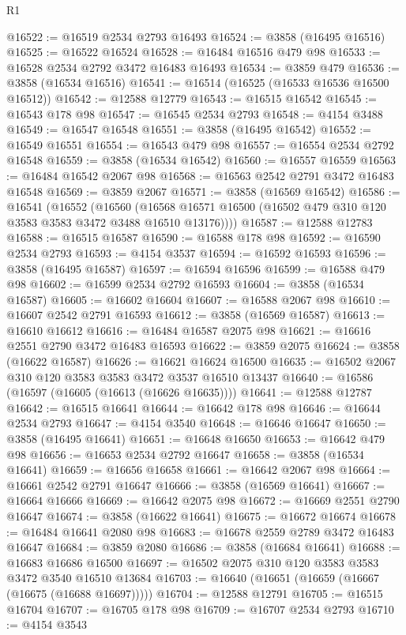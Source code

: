 \begin{lexlean}{R1}
\begin{coremodule}
@16522 := @16519 @2534 @2793 @16493
@16524 := @3858 (@16495 @16516)
@16525 := @16522 @16524
@16528 := @16484 @16516 @479 @98
@16533 := @16528 @2534 @2792 @3472 @16483 @16493
@16534 := @3859 @479
@16536 := @3858 (@16534 @16516)
@16541 := @16514 (@16525 (@16533 @16536 @16500 @16512))
@16542 := @12588 @12779
@16543 := @16515 @16542
@16545 := @16543 @178 @98
@16547 := @16545 @2534 @2793
@16548 := @4154 @3488
@16549 := @16547 @16548
@16551 := @3858 (@16495 @16542)
@16552 := @16549 @16551
@16554 := @16543 @479 @98
@16557 := @16554 @2534 @2792 @16548
@16559 := @3858 (@16534 @16542)
@16560 := @16557 @16559
@16563 := @16484 @16542 @2067 @98
@16568 := @16563 @2542 @2791 @3472 @16483 @16548
@16569 := @3859 @2067
@16571 := @3858 (@16569 @16542)
@16586 := @16541
    (@16552
      (@16560 (@16568 @16571 @16500 (@16502 @479 @310 @120 @3583 @3583 @3472 @3488 @16510 @13176))))
@16587 := @12588 @12783
@16588 := @16515 @16587
@16590 := @16588 @178 @98
@16592 := @16590 @2534 @2793
@16593 := @4154 @3537
@16594 := @16592 @16593
@16596 := @3858 (@16495 @16587)
@16597 := @16594 @16596
@16599 := @16588 @479 @98
@16602 := @16599 @2534 @2792 @16593
@16604 := @3858 (@16534 @16587)
@16605 := @16602 @16604
@16607 := @16588 @2067 @98
@16610 := @16607 @2542 @2791 @16593
@16612 := @3858 (@16569 @16587)
@16613 := @16610 @16612
@16616 := @16484 @16587 @2075 @98
@16621 := @16616 @2551 @2790 @3472 @16483 @16593
@16622 := @3859 @2075
@16624 := @3858 (@16622 @16587)
@16626 := @16621 @16624 @16500
@16635 := @16502 @2067 @310 @120 @3583 @3583 @3472 @3537 @16510 @13437
@16640 := @16586 (@16597 (@16605 (@16613 (@16626 @16635))))
@16641 := @12588 @12787
@16642 := @16515 @16641
@16644 := @16642 @178 @98
@16646 := @16644 @2534 @2793
@16647 := @4154 @3540
@16648 := @16646 @16647
@16650 := @3858 (@16495 @16641)
@16651 := @16648 @16650
@16653 := @16642 @479 @98
@16656 := @16653 @2534 @2792 @16647
@16658 := @3858 (@16534 @16641)
@16659 := @16656 @16658
@16661 := @16642 @2067 @98
@16664 := @16661 @2542 @2791 @16647
@16666 := @3858 (@16569 @16641)
@16667 := @16664 @16666
@16669 := @16642 @2075 @98
@16672 := @16669 @2551 @2790 @16647
@16674 := @3858 (@16622 @16641)
@16675 := @16672 @16674
@16678 := @16484 @16641 @2080 @98
@16683 := @16678 @2559 @2789 @3472 @16483 @16647
@16684 := @3859 @2080
@16686 := @3858 (@16684 @16641)
@16688 := @16683 @16686 @16500
@16697 := @16502 @2075 @310 @120 @3583 @3583 @3472 @3540 @16510 @13684
@16703 := @16640 (@16651 (@16659 (@16667 (@16675 (@16688 @16697)))))
@16704 := @12588 @12791
@16705 := @16515 @16704
@16707 := @16705 @178 @98
@16709 := @16707 @2534 @2793
@16710 := @4154 @3543

\end{coremodule}
\end{lexlean}
